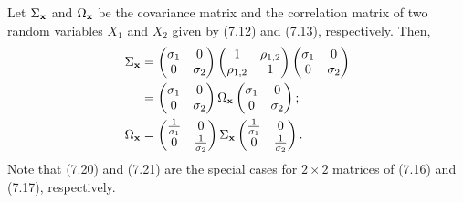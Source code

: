 Let $\Sigma_{\mathbf{x}}$ and $\Omega_{\mathbf{x}}$ be the covariance matrix and the correlation
matrix of two random variables $X_1$ and $X_2$ given by (7.12) and (7.13),
respectively. Then,
\begin{align}
\Sigma_{\mathbf{x}} &= \begin{pmatrix} \sigma_1 & 0 \\ 0 & \sigma_2 \end{pmatrix}
\begin{pmatrix} 1 & \rho_{1,2} \\ \rho_{1,2} & 1 \end{pmatrix}
\begin{pmatrix} \sigma_1 & 0 \\ 0 & \sigma_2 \end{pmatrix} \notag \\
&= \begin{pmatrix} \sigma_1 & 0 \\ 0 & \sigma_2 \end{pmatrix} \Omega_{\mathbf{x}}
\begin{pmatrix} \sigma_1 & 0 \\ 0 & \sigma_2 \end{pmatrix}; \\
\Omega_{\mathbf{x}} &= \begin{pmatrix} \frac{1}{\sigma_1} & 0 \\ 0 & \frac{1}{\sigma_2} \end{pmatrix}
\Sigma_{\mathbf{x}} \begin{pmatrix} \frac{1}{\sigma_1} & 0 \\ 0 & \frac{1}{\sigma_2} \end{pmatrix}.
\end{align}
Note that (7.20) and (7.21) are the special cases for $2\times 2$ matrices of (7.16)
and (7.17), respectively.


